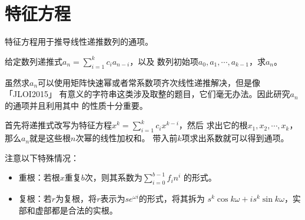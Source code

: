 \section{特征方程}
特征方程用于推导线性递推数列的通项。

给定数列递推式$a_n=\displaystyle \sum_{i=1}^k{c_ia_{n-i}}$，以及
数列初始项$a_0,a_1,\cdots,a_{k-1}$，求$a_n$。

虽然求$a_n$可以使用矩阵快速幂或者常系数项齐次线性递推解决，但是像「JLOI2015」
有意义的字符串这类涉及取整的题目，它们毫无办法。因此研究$a_n$的通项并且利用其中
的性质十分重要。

首先将递推式改写为特征方程$x^k=\displaystyle \sum_{i=1}^k{c_ix^{k-i}}$，然后
求出它的根$x_1,x_2,\cdots,x_k$，那么$a_n$就是这些根$n$次幂的线性加权和。
带入前$k$项求出系数就可以得到通项。

注意以下特殊情况：
\begin{itemize}
    \item 重根：若根$x$重复$b$次，则其系数为$\displaystyle \sum_{i=0}^{b-1}{f_in^i}$
    的形式。
    \item 复根：若$r$为复根，将$r$表示为$se^{\omega i}$的形式，将其拆为
    $s^k\cos k\omega+is^k\sin k\omega$，实部和虚部都是合法的实根。
\end{itemize}

